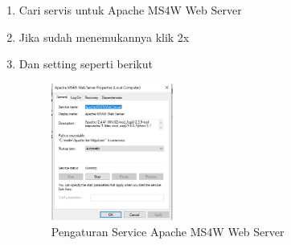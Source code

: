\begin{enumerate}
  \item Cari servis untuk Apache MS4W Web Server
  \item Jika sudah menemukannya klik 2x
  \item Dan setting seperti berikut
  \hfill\break
    \begin{figure}[H]
		\includegraphics[width=4cm]{figures/1174095/4/Conf7.png}
		\centering
		\caption{Pengaturan Service Apache MS4W Web Server}
    \end{figure}
\end{enumerate}

